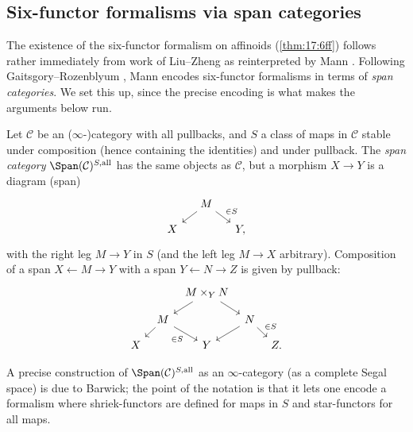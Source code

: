 \subsection{Six-functor formalisms via span categories}
\label{subsec:17:spans}

The existence of the six-functor formalism on affinoids (\cref{thm:17:6ff}) follows
rather immediately from work of Liu--Zheng \cite{liu2024enhancedoperationsbasechange}
as reinterpreted by Mann \cite{mann2022padic6functorformalismrigidanalytic}. Following
Gaitsgory--Rozenblyum \cite{gaitsgory2017study}, Mann encodes six-functor formalisms in
terms of \emph{span categories}. We set this up, since the precise encoding is what makes
the arguments below run.

\begin{definition}
\label{def:17:span}
Let $\mathcal C$ be an ($\infty$-)category with all pullbacks, and $S$ a class of maps in
$\mathcal C$ stable under composition (hence containing the identities) and under pullback.
The \emph{span category} $\Span(\mathcal C)^{S,\mathrm{all}}$ has the same objects as
$\mathcal C$, but a morphism $X\to Y$ is a diagram (span)
\begin{equation*}
\begin{tikzcd}[column sep=small, row sep=small]
& M \arrow[dl] \arrow[dr, "\in S"] & \\
X & & Y,
\end{tikzcd}
\end{equation*}
with the right leg $M\to Y$ in $S$ (and the left leg $M\to X$ arbitrary). Composition of a
span $X\leftarrow M\to Y$ with a span $Y\leftarrow N\to Z$ is given by pullback:
\begin{equation*}
\begin{tikzcd}[column sep=tiny, row sep=small]
& & M\times_{Y}N \arrow[dl] \arrow[dr] & & \\
& M \arrow[dl] \arrow[dr, "\in S"'] & & N \arrow[dl] \arrow[dr, "\in S"] & \\
X & & Y & & Z.
\end{tikzcd}
\end{equation*}
\end{definition}

A precise construction of $\Span(\mathcal C)^{S,\mathrm{all}}$ as an $\infty$-category (as
a complete Segal space) is due to Barwick; the point of the notation is that it lets one
encode a formalism where shriek-functors are defined for maps in $S$ and star-functors for
all maps.

